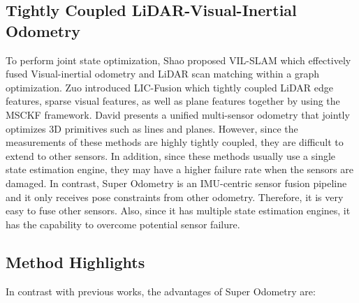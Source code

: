 \subsection{Tightly Coupled LiDAR-Visual-Inertial Odometry}
To perform joint state optimization, Shao proposed VIL-SLAM \cite{shao2019stereo} which effectively fused Visual-inertial odometry and LiDAR scan matching within a graph optimization.
Zuo \cite{zuo2020licfusion} introduced LIC-Fusion which tightly coupled LiDAR edge features, sparse visual features, as well as plane features together by using the MSCKF framework\cite{msckf}.
David \cite{Wisth_2021} presents a unified multi-sensor odometry that jointly optimizes 3D primitives such as lines and planes. However, since the measurements of these methods are highly tightly coupled, they are difficult to extend to other sensors. In addition, since these methods usually use a single state estimation engine, they may have a higher failure rate when the sensors are damaged.
In contrast, Super Odometry is an IMU-centric sensor fusion pipeline and it only receives pose constraints from other odometry. Therefore, it is very easy to fuse other sensors. Also, since it has multiple state estimation engines, it has the capability to overcome potential sensor failure.


\subsection{Method Highlights}
In contrast with previous works, the advantages of Super Odometry are: 

